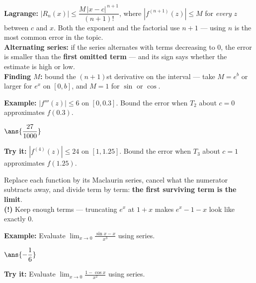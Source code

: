 \documentclass[12pt]{article}
\begin{document}
\begin{formulabox}
\textbf{Lagrange:} $|R_n(x)| \le \dfrac{M\,|x-c|^{\,n+1}}{(n+1)!}$, where
$\left|f^{(n+1)}(z)\right| \le M$ for \emph{every} $z$ between $c$ and $x$.
Both the exponent and the factorial use $n+1$ --- using $n$ is the most common
error in the topic.\\[3pt]
\textbf{Alternating series:} if the series alternates with terms decreasing to
$0$, the error is smaller than the \textbf{first omitted term} --- and its
sign says whether the estimate is high or low.\\[3pt]
\textbf{Finding $M$:} bound the $(n+1)$st derivative on the interval --- take
$M = e^{b}$ or larger for $e^x$ on $[0,b]$, and $M = 1$ for $\sin$ or $\cos$.
\end{formulabox}
\begin{examplebox}
\textbf{Example:} $\left|f'''(z)\right| \le 6$ on $[0, 0.3]$. Bound the error
when $T_2$ about $c = 0$ approximates $f(0.3)$.
\par
$\ans{\dfrac{27}{1000}}$
\end{examplebox}
\begin{tryitbox}
\textbf{Try it:} $\left|f^{(4)}(z)\right| \le 24$ on $[1, 1.25]$. Bound the
error when $T_3$ about $c = 1$ approximates $f(1.25)$.\\[2pt]
\end{tryitbox}

\begin{formulabox}
Replace each function by its Maclaurin series, cancel what the numerator
subtracts away, and divide term by term: \textbf{the first surviving term is
the limit}.\\[3pt]
\textbf{(!)} Keep enough terms --- truncating $e^x$ at $1+x$ makes
$e^x - 1 - x$ look like exactly $0$.
\end{formulabox}
\begin{examplebox}
\textbf{Example:} Evaluate
$\displaystyle\lim_{x \to 0} \frac{\sin x - x}{x^3}$ using series.
\par
$\ans{-\dfrac{1}{6}}$
\end{examplebox}
\begin{tryitbox}
\textbf{Try it:} Evaluate
$\displaystyle\lim_{x \to 0} \frac{1 - \cos x}{x^2}$ using series.\\[2pt]
\end{tryitbox}
\end{document}
